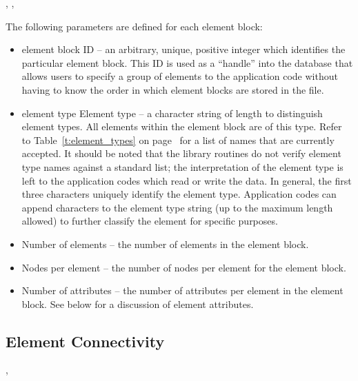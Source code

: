 \begin{spacing}{1.5}
\api {}, , 
\end{spacing}

The following parameters are defined for each element block:

\begin{itemize}
 \item element block ID -- an arbitrary, unique, positive integer
 which identifies the particular element block. This ID is used as a
 ``handle'' into the database that allows users to specify a group of
 elements to the application code without having to know the order in
 which element blocks are stored in the file.

 \item element type Element type -- a character string of length
  to distinguish element types. All elements
 within the element block are of this type. Refer to
 Table~\ref{t:element_types} on page~\pageref{t:element_types} for a
 list of names that are currently accepted. It should be noted that
 the \exo{} library routines do not verify element type names against
 a standard list; the interpretation of the element type is left to
 the application codes which read or write the data. In general, the
 first three characters uniquely identify the element
 type. Application codes can append characters to the element type
 string (up to the maximum length allowed) to further classify the
 element for specific purposes.

 \item {Number of elements -- the number of elements in the
element block.}

 \item {Nodes per element -- the number of nodes per element
for the element block.}

 \item {Number of attributes -- the number of attributes per element
 in the element block. See below for a discussion of element
 attributes.}
\end{itemize}



\subsection{Element Connectivity}

\begin{spacing}{1.5}
\api {}, 
\end{spacing}

